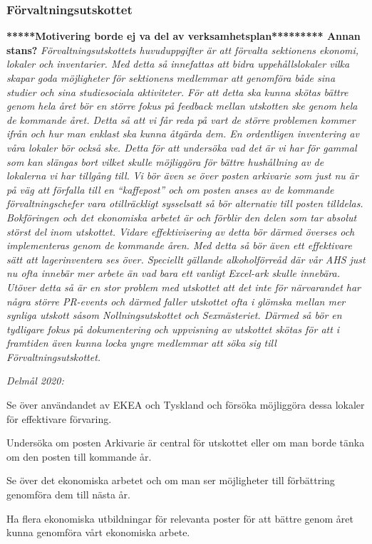 \documentclass[../_main/handlingar.tex]{subfiles}
\begin{document}
\subsubsection*{Förvaltningsutskottet}

\textbf{*****Motivering borde ej va del av verksamhetsplan********* Annan stans?}
\textit{Förvaltningsutskottets huvuduppgifter är att förvalta sektionens ekonomi, lokaler och inventarier. Med detta så innefattas att bidra uppehållslokaler vilka skapar goda möjligheter för sektionens medlemmar att genomföra både sina studier och sina studiesociala aktiviteter. 
För att detta ska kunna skötas bättre genom hela året bör en större fokus på feedback mellan utskotten ske genom hela de kommande året. Detta så att vi får reda på vart de större problemen kommer ifrån och hur man enklast ska kunna åtgärda dem. 
En ordentligen inventering av våra lokaler bör också ske. Detta för att undersöka vad det är vi har för gammal som kan slängas bort vilket skulle möjliggöra för bättre hushållning av de lokalerna vi har tillgång till.
}
\textit{
Vi bör även se över posten arkivarie som just nu är på väg att förfalla till en “kaffepost” och om posten anses av de kommande förvaltningschefer vara otillräckligt sysselsatt så bör alternativ till posten tilldelas.
Bokföringen och det ekonomiska arbetet är och förblir den delen som tar absolut störst del inom utskottet. Vidare effektivisering av detta bör därmed överses och implementeras genom de kommande åren.
Med detta så bör även ett effektivare sätt att lagerinventera ses över. Speciellt gällande alkoholförreåd där vår AHS just nu ofta innebär mer arbete än vad bara ett vanligt Excel-ark skulle innebära.
Utöver detta så är en stor problem med utskottet att det inte för närvarandet har några större PR-events och därmed faller utskottet ofta i glömska mellan mer synliga utskott såsom Nollningsutskottet och Sexmästeriet. Därmed så bör en tydligare fokus på dokumentering och uppvisning av utskottet skötas för att i framtiden även kunna locka yngre medlemmar att söka sig till Förvaltningsutskottet.
}

\emph{Delmål 2020:}
\begin{dashlist}
	\item Se över användandet av EKEA och Tyskland och försöka möjliggöra dessa lokaler för effektivare förvaring.
	\item Undersöka om posten Arkivarie är central för utskottet eller om man borde tänka om den posten till kommande år.
	\item Se över det ekonomiska arbetet och om man ser möjligheter till förbättring genomföra dem till nästa år.
	\item Ha flera ekonomiska utbildningar för relevanta poster för att bättre genom året kunna genomföra vårt ekonomiska arbete.
\end{dashlist}
\end{document}
